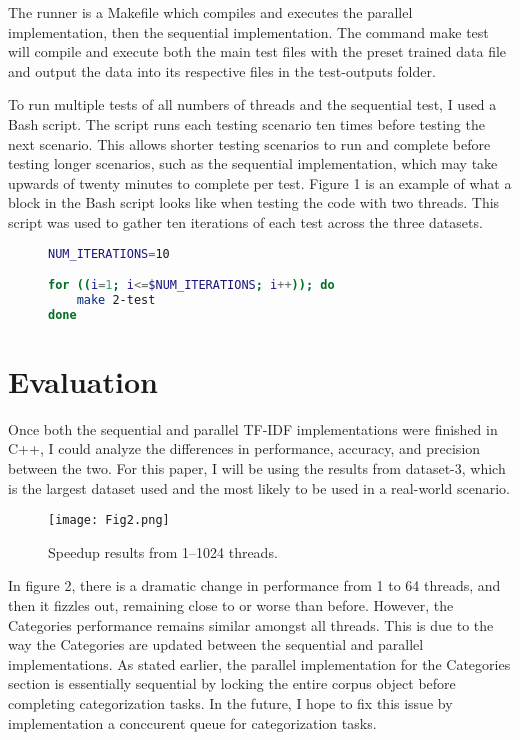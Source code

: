 \documentclass[conference]{IEEEtran}
\begin{document}
The runner is a Makefile which compiles and executes the parallel implementation, then the sequential implementation. The command make test will compile and execute both the main test files with the preset trained data file and output the data into its respective files in the test-outputs folder.

To run multiple tests of all numbers of threads and the sequential test, I used a Bash script. The script runs each testing scenario ten times before testing the next scenario. This allows shorter testing scenarios to run and complete before testing longer scenarios, such as the sequential implementation, which may take upwards of twenty minutes to complete per test. Figure 1 is an example of what a block in the Bash script looks like when testing the code with two threads. This script was used to gather ten iterations of each test across the three datasets.

\begin{figure}[htbp]
\centering    
\begin{minipage}{0.95\linewidth}
\begin{lstlisting}[style=ieeecpp, language=bash]
NUM_ITERATIONS=10

for ((i=1; i<=$NUM_ITERATIONS; i++)); do
    make 2-test
done
\end{lstlisting}
\end{minipage}
\end{figure}

\section{Evaluation} \label{sec:evaluation}
Once both the sequential and parallel TF-IDF implementations were finished in C++, I could analyze the differences in performance, accuracy, and precision between the two. For this paper, I will be using the results from dataset-3, which is the largest dataset used and the most likely to be used in a real-world scenario.

\begin{figure}[htbp]
\centerline{\texttt{[image: Fig2.png]}}
\caption{Speedup results from 1--1024 threads.}
\label{fig}
\end{figure}

In figure 2, there is a dramatic change in performance from 1 to 64 threads, and then it fizzles out, remaining close to or worse than before. However, the Categories performance remains similar amongst all threads. This is due to the way the Categories are updated between the sequential and parallel implementations. As stated earlier, the parallel implementation for the Categories section is essentially sequential by locking the entire corpus object before completing categorization tasks. In the future, I hope to fix this issue by implementation a conccurent queue for categorization tasks.
\end{document}
